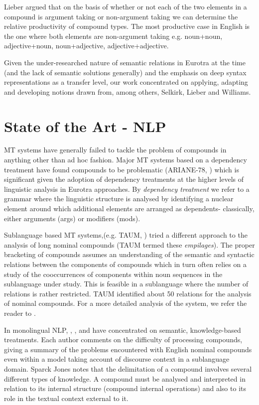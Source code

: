 Lieber argued that on the basis of whether or not each of the two 
elements in a compound is argument taking or non-argument  taking 
we can determine the relative productivity of compound types. The 
most  productive  case in English is the one where both  elements 
are   non-argument   taking   e.g.   noun+noun,   adjective+noun, 
noun+adjective, adjective+adjective. 

Given  the  under-researched  nature  of  semantic  relations  in 
Eurotra  at  the  time (and the  lack  of  semantic  solutions 
generally)  and the emphasis on deep syntax representations as  a 
transfer level,  our work concentrated on applying,  adapting and 
developing notions drawn from,  among others, Selkirk, Lieber and 
Williams.

\section{State of the Art - NLP}

MT  systems  have  generally  failed to  tackle  the  problem  of 
compounds  in anything \mbox{other} than ad  hoc  fashion.  
Major  MT  systems based on a dependency treatment  have
found  compounds  to be problematic  (ARIANE-78, \cite{Guilbaud87}) 
which  is significant given the adoption of dependency treatments 
at   the  higher  levels  of  linguistic  analysis   in   Eurotra 
approaches.  By {\it dependency treatment} we refer to a 
grammar where the linguistic structure is analysed by identifying  
a 
nuclear  element around which additional elements are arranged as 
dependents- classically,  either  arguments  (args) or  modifiers 
(mods).

Sublanguage based MT systems,(e.g. TAUM, \cite{Lehrberger82}) tried
a
different approach to the analysis of long nominal compounds
(TAUM termed these  {\it empilages}). The
proper bracketing of compounds assumes an understanding of the
semantic and syntactic relations between the components of
compounds
which in turn often relies on a
study of the cooccurrences of components within noun sequences
in the
sublanguage under study.
 This is feasible in a sublanguage where
the number of relations is rather restricted. TAUM identified
about 50 relations for the analysis of nominal compounds. For a
more detailed analysis of the system, we
refer the reader to \cite[pp.~81--106]{Lehrberger82}.

In monolingual NLP, \cite{Finin86}, \cite{McDonald82}, \cite{Sparck-Jones83}
and \cite{Hoeppner82}  have  concentrated  on 
semantic, knowledge-based treatments. Each author comments on the 
difficulty  of  processing compounds, \cite[p.~165]{Finin86} giving  a 
summary   of  the  problems  encountered  with  English   nominal 
compounds even within a model taking account of discourse context 
in a sublanguage domain. Sparck Jones notes that the delimitation 
of  a compound involves several different types of  knowledge.  A 
compound  must  be analysed and interpreted in  relation  to  its 
internal structure (compound internal operations) and also to its 
role in the textual context external to it.

